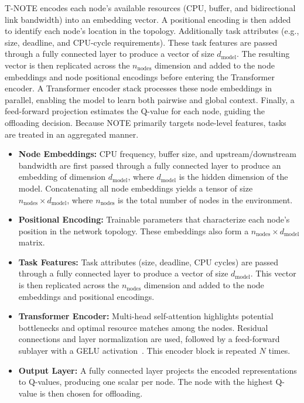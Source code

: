\documentclass{svproc}
\begin{document}
T-NOTE encodes each node’s available resources (CPU, buffer, and bidirectional link bandwidth) into an embedding vector. A positional encoding is then added to identify each node’s location in the topology. Additionally task attributes (e.g., size, deadline, and CPU-cycle requirements). These task features are passed through a fully connected layer to produce a vector of size \(d_{\text{model}}\). The resulting vector is then replicated across the \(n_{\text{nodes}}\) dimension and added to the node embeddings and node positional encodings before entering the Transformer encoder.
A Transformer encoder stack processes these node embeddings in parallel, enabling the model to learn both pairwise and global context. Finally, a feed-forward projection estimates the Q-value for each node, guiding the offloading decision. Because NOTE primarily targets node-level features, tasks are treated in an aggregated manner.

\begin{itemize}
    \item \textbf{Node Embeddings:} CPU frequency, buffer size, and upstream/downstream bandwidth are first passed through a fully connected layer to produce an embedding of dimension \(\displaystyle d_{\text{model}}\), where \(d_{\text{model}}\) is the hidden dimension of the model. Concatenating all node embeddings yields a tensor of size \(\displaystyle n_{\text{nodes}} \times d_{\text{model}}\), where \(n_{\text{nodes}}\) is the total number of nodes in the environment.
    \item \textbf{Positional Encoding:} Trainable parameters that characterize each node’s position in the network topology. These embeddings also form a \(\displaystyle n_{\text{nodes}} \times d_{\text{model}}\) matrix.
    \item \textbf{Task Features:} Task attributes (size, deadline, CPU cycles) are passed through a fully connected layer to produce a vector of size \(\displaystyle d_{\text{model}}\). This vector is then replicated across the \(n_{\text{nodes}}\) dimension and added to the node embeddings and positional encodings.
    \item \textbf{Transformer Encoder:} Multi-head self-attention highlights potential bottlenecks and optimal resource matches among the nodes. Residual connections and layer normalization are used, followed by a feed-forward sublayer with a GELU activation~\cite{hendrycks2023gaussianerrorlinearunits}. This encoder block is repeated \(N\) times.
    \item \textbf{Output Layer:} A fully connected layer projects the encoded representations to Q-values, producing one scalar per node. The node with the highest Q-value is then chosen for offloading.
\end{itemize}
\end{document}

